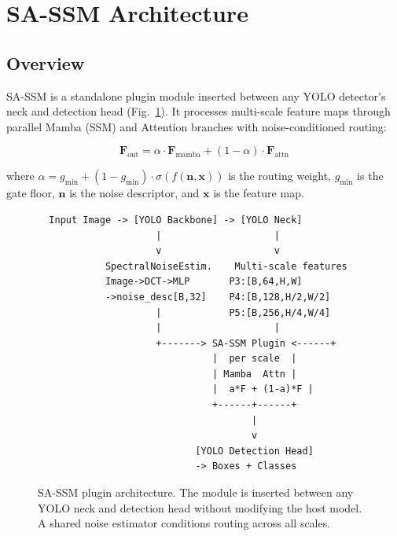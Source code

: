 \documentclass[conference]{IEEEtran}
\begin{document}
\section{SA-SSM Architecture}

\subsection{Overview}

SA-SSM is a standalone plugin module inserted between any YOLO detector's neck and detection head (Fig.~\ref{fig:overview}). It processes multi-scale feature maps through parallel Mamba (SSM) and Attention branches with noise-conditioned routing:

\begin{equation}
\mathbf{F}_{\text{out}} = \alpha \cdot \mathbf{F}_{\text{mamba}} + (1 - \alpha) \cdot \mathbf{F}_{\text{attn}}
\label{eq:routing}
\end{equation}

where $\alpha = g_{\min} + (1 - g_{\min}) \cdot \sigma(f(\mathbf{n}, \mathbf{x}))$ is the routing weight, $g_{\min}$ is the gate floor, $\mathbf{n}$ is the noise descriptor, and $\mathbf{x}$ is the feature map.

\begin{figure}[t]
\centering
\small
\begin{verbatim}
  Input Image -> [YOLO Backbone] -> [YOLO Neck]
                     |                    |
                     v                    v
            SpectralNoiseEstim.    Multi-scale features
            Image->DCT->MLP       P3:[B,64,H,W]
            ->noise_desc[B,32]    P4:[B,128,H/2,W/2]
                     |            P5:[B,256,H/4,W/4]
                     |                    |
                     +-------> SA-SSM Plugin <------+
                               |  per scale  |
                               | Mamba  Attn |
                               |  a*F + (1-a)*F |
                               +------+------+
                                      |
                                      v
                            [YOLO Detection Head]
                            -> Boxes + Classes
\end{verbatim}
\caption{SA-SSM plugin architecture. The module is inserted between any YOLO neck and detection head without modifying the host model. A shared noise estimator conditions routing across all scales.}
\label{fig:overview}
\end{figure}
\end{document}
